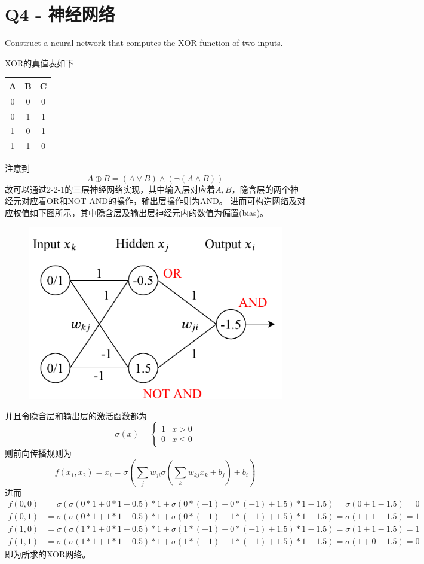 \documentclass[a4paper, 11pt]{article}
\begin{document}
\begin{flushleft}
\end{flushleft}

\newpage
\section{Q4 - 神经网络}
\begin{question}\normalfont
Construct a neural network that computes the $\mathrm{XOR}$ function of two inputs.
\end{question}
\begin{answer}
XOR的真值表如下
\begin{center}
\begin{tabular}{|c|c|c|}\hline
A & B & C\\\hline
0 & 0 & 0\\\hline
0 & 1 & 1\\\hline
1 & 0 & 1\\\hline
1 & 1 & 0\\\hline
\end{tabular}
\end{center}
注意到
\[A \oplus B= (A \lor B) \land (\lnot (A \land B))\]
故可以通过2-2-1的三层神经网络实现，其中输入层对应着$A,B$，隐含层的两个神经元对应着OR和NOT AND的操作，输出层操作则为AND。
进而可构造网络及对应权值如下图所示，其中隐含层及输出层神经元内的数值为偏置(bias)。
\begin{figure}[H]
\centering
\includegraphics[width=0.5\linewidth]{fig/T04-Q4.pdf}
\end{figure}
并且令隐含层和输出层的激活函数都为
\[\sigma(x)=\begin{cases}
    1 & x > 0\\
    0 & x\leq 0
\end{cases}\]
则前向传播规则为
\[f(x_1,x_2)=x_i=\sigma\left(\sum_j w_{ji}\sigma\left(\sum_k w_{kj}x_k + b_j\right)+b_i\right)\]
进而
\[\begin{aligned}
    f(0,0)&=\sigma(\sigma(0*1+0*1-0.5)*1+\sigma(0*(-1)+0*(-1)+1.5)*1-1.5)=\sigma(0+1-1.5)=0\\
    f(0,1)&=\sigma(\sigma(0*1+1*1-0.5)*1+\sigma(0*(-1)+1*(-1)+1.5)*1-1.5)=\sigma(1+1-1.5)=1\\
    f(1,0)&=\sigma(\sigma(1*1+0*1-0.5)*1+\sigma(1*(-1)+0*(-1)+1.5)*1-1.5)=\sigma(1+1-1.5)=1\\
    f(1,1)&=\sigma(\sigma(1*1+1*1-0.5)*1+\sigma(1*(-1)+1*(-1)+1.5)*1-1.5)=\sigma(1+0-1.5)=0
\end{aligned}\]
即为所求的XOR网络。
\end{answer}
\end{document}

